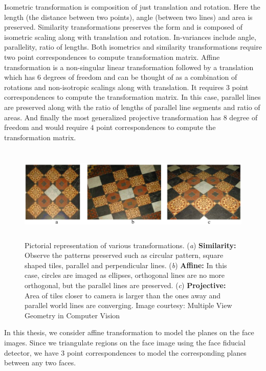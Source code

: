 Isometric transformation is composition of just translation and rotation. Here the length 
(the distance between two points), angle (between two lines) and area is preserved. Similarity transformations
preserves the form and is composed of isometric scaling along with translation and rotation. In-variances
include angle, parallelity, ratio of lengths. Both isometrics and similarity transformations require two
point correspondences to compute transformation matrix. Affine transformation is a non-singular linear
transformation followed by a translation which has $6$ degrees of freedom and can be thought of as a 
combination of rotations and non-isotropic scalings along with translation. It requires $3$ point 
correspondences to compute the transformation matrix. In this case, parallel lines are preserved along with the
ratio of lengths of parallel line segments and ratio of areas. And finally the most generalized projective
transformation has $8$ degree of freedom and would require $4$ point correspondences to compute the 
transformation matrix. 

\begin{figure}
    \centering
    \includegraphics[width=6in, height=1.8in]{concepts/figures/affine_transformation.png}
    \caption{Pictorial representation of various transformations. (\textit{a}) \textbf{Similarity:} Observe the patterns preserved such as circular pattern, square shaped tiles, parallel and perpendicular lines.
    (\textit{b}) \textbf{Affine:} In this case, circles are imaged as ellipses, orthogonal lines are no more orthogonal, but the parallel lines are
    preserved. (\textit{c}) \textbf{Projective:} Area of tiles closer to camera is larger than the ones away and parallel world lines are converging. Image courtesy: Multiple View Geometry in Computer Vision\cite{Hartley2004}}
    \label{fig:affine_transformation}
\end{figure}

In this thesis, we consider affine transformation to model the planes on the face images. Since we triangulate
regions on the face image using the face fiducial detector, we have $3$ point correspondences to model the
corresponding planes between any two faces.
